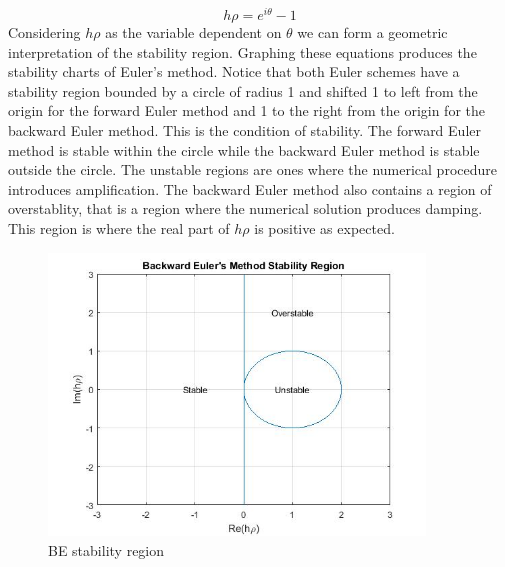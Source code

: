 \documentclass{article}
\begin{document}
				\begin{equation}
					 h\rho = e^{i\theta} - 1
				\end{equation}
Considering $h\rho$ as the variable dependent on $\theta$ we can form a geometric interpretation of the stability region. Graphing these equations produces the stability charts of Euler's method. Notice that both Euler schemes have a stability region bounded by a circle of radius 1 and shifted 1 to left from the origin for the forward Euler method and 1 to the right from the origin for the backward Euler method. This is the condition of stability. The forward Euler method is stable within the circle while the backward Euler method is stable outside the circle. The unstable regions are ones where the numerical procedure introduces amplification. The backward Euler method also contains a region of overstablity, that is a region where the numerical solution produces damping. This region is where the real part of $h\rho$ is positive as expected. 
				\begin{figure}[h!]
   					\centering
   					\includegraphics[width=100mm]{pictures/GraphEulerB.jpg}
					\centering
   					\caption{BE stability region}
				           \label{fig4}
  				\end{figure}
\end{document}
